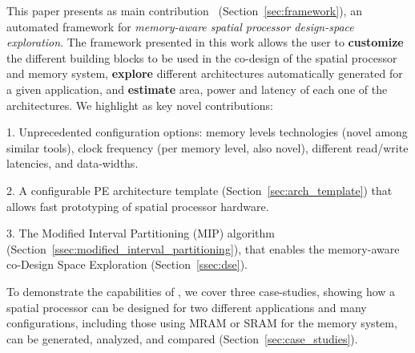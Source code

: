 This paper presents as main contribution \frameworkname~(Section~\ref{sec:framework}), an automated framework for \textit{memory-aware spatial processor design-space exploration}. The framework presented in this work allows the user to \textbf{customize} the different building blocks to be used in the co-design of the spatial processor and memory system, \textbf{explore} different architectures automatically generated for a given application, and \textbf{estimate} area, power and latency of each one of the architectures.
We highlight as key novel contributions:

1. Unprecedented configuration options: memory levels technologies (novel among similar tools), clock frequency (per memory level, also novel), different read/write latencies, and data-widths.

2. A configurable PE architecture template (Section~\ref{sec:arch_template}) that allows fast prototyping of spatial processor hardware.

3. The Modified Interval Partitioning (MIP) algorithm (Section~\ref{ssec:modified_interval_partitioning}), that enables the memory-aware co-Design Space Exploration (Section~\ref{ssec:dse}).

To demonstrate the capabilities of \frameworkname, we cover three case-studies, showing how a spatial processor can be designed for two different applications and many configurations, including those using MRAM or SRAM for the memory system, can be generated, analyzed, and compared (Section~\ref{sec:case_studies}).




